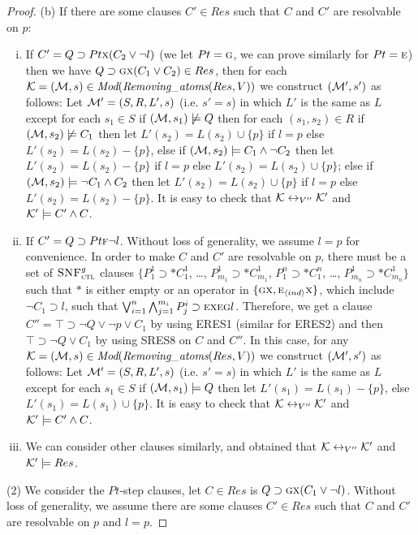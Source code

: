 \documentclass[letterpaper]{article}
\begin{document}
\begin{proof}
(b) If there are some clauses $C'\in Res$ such that $C$ and $C'$ are resolvable on $p$:
\begin{enumerate}[(i)]
    \item If $C'= Q\supset Pt \textsc{x} (C_2 \vee \neg l)$ (we let $Pt=\textsc{g}$, we can prove similarly for $Pt = \textsc{e}$) then we have $Q\supset \textsc{g} \textsc{x}(C_1 \vee C_2) \in Res$, then for each ${\cal K}=({\cal M}, s)\in \textit{Mod}(\emph{Removing\_atoms}(Res, V))$ we construct $({\cal M}',s')$ as follows: Let ${\cal M}'= (S, R, L',s)$ (i.e. $s'=s$) in which $L'$ is the same as $L$ except for each $s_1\in S$ if $({\cal M}, s_1) \not \models Q$ then for each $(s_1, s_2) \in R$ if $({\cal M}, s_2) \not \models C_1$ then let $L'(s_2) = L(s_2) \cup \{p\}$ if $l=p$ else $L'(s_2) = L(s_2) - \{p\}$, else if $({\cal M}, s_2) \models  C_1 \wedge \neg C_2$ then let $L'(s_2) = L(s_2) - \{p\}$ if $l=p$ else $L'(s_2) = L(s_2) \cup \{p\}$; else if $({\cal M}, s_2) \models \neg C_1 \wedge C_2$ then let $L'(s_2) = L(s_2) \cup \{p\}$ if $l=p$ else $L'(s_2) = L(s_2) - \{p\}$. It is easy to check that ${\cal K} \leftrightarrow_{V''} {\cal K}'$ and ${\cal K}' \models C' \wedge C$.
    \item If $C' =  Q\supset Pt \textsc{f} \neg l$. Without loss of generality, we assume $l=p$ for convenience. In order to make $C$ and $C'$ are resolvable on $p$, there must be a set of ${\textsc{SNF}_{\textsc{ctl}}^g}$ clauses $\{P_1^1 \supset * C_1^1$, \dots, $P_{m_1}^1 \supset * C_{m_1}^1$, $P_1^n \supset * C_1^n$, \dots, $P_{m_n}^1 \supset * C_{m_n}^1 \}$ such that $*$ is either empty or
an operator in $\{\textsc{g} \textsc{x}, \textsc{e}_{{\langle{ind}\rangle}} \textsc{x}\}$, which include $\neg C_1 \supset l$, such that $\bigvee_{i=1}^n \bigwedge_{j=1}^{m_i} P_j^i \supset \textsc{e} \textsc{x} \textsc{e} \textsc{g} l$. Therefore, we get a clause $C''=\top \supset \neg Q \vee \neg p \vee C_1$ by using ERES1 (similar for ERES2) and then $\top \supset \neg Q \vee C_1$ by using SRES8 on $C$ and $C''$. In this case, for any ${\cal K}=({\cal M}, s)\in \textit{Mod}(\emph{Removing\_atoms}(Res, V))$ we construct $({\cal M}',s')$ as follows: Let ${\cal M}'= (S, R, L',s)$ (i.e. $s'=s$) in which $L'$ is the same as $L$ except for each $s_1\in S$ if $({\cal M}, s_1) \models Q$ then let $L'(s_1) = L(s_1) - \{p\}$, else $L'(s_1) = L(s_1) \cup \{p\}$. It is easy to check that ${\cal K} \leftrightarrow_{V''} {\cal K}'$ and ${\cal K}' \models C' \wedge C$.   
    \item We can consider other clauses similarly, and obtained that ${\cal K} \leftrightarrow_{V''} {\cal K}'$ and ${\cal K}' \models Res$. 
\end{enumerate}
 
(2) We consider the $Pt$-step clauses, let $C\in Res$ is $Q \supset \textsc{g} \textsc{x}(C_1 \vee \neg l)$. Without loss of generality, we assume there are some clauses $C'\in Res$ such that $C$ and $C'$ are resolvable on $p$ and $l=p$.


\end{proof}
\end{document}
